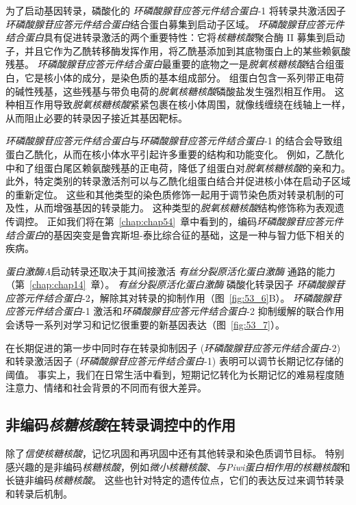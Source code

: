为了启动基因转录，磷酸化的 \textit{环磷酸腺苷应答元件结合蛋白}-1 将转录共激活因子\textit{环磷酸腺苷应答元件结合蛋白}结合蛋白募集到启动子区域。
\textit{环磷酸腺苷应答元件结合蛋白}具有促进转录激活的两个重要特性：它将\textit{核糖核酸}聚合酶 II 募集到启动子，并且它作为乙酰转移酶发挥作用，将乙酰基添加到其底物蛋白上的某些赖氨酸残基。
\textit{环磷酸腺苷应答元件结合蛋白}最重要的底物之一是\textit{脱氧核糖核酸}结合组蛋白，它是核小体的成分，是染色质的基本组成部分。
组蛋白包含一系列带正电荷的碱性残基，这些残基与带负电荷的\textit{脱氧核糖核酸}磷酸盐发生强烈相互作用。
这种相互作用导致\textit{脱氧核糖核酸}紧紧包裹在核小体周围，就像线缠绕在线轴上一样，从而阻止必要的转录因子接近其基因靶标。


\textit{环磷酸腺苷应答元件结合蛋白}与\textit{环磷酸腺苷应答元件结合蛋白}-1 的结合会导致组蛋白乙酰化，从而在核小体水平引起许多重要的结构和功能变化。
例如，乙酰化中和了组蛋白尾区赖氨酸残基的正电荷，降低了组蛋白对\textit{脱氧核糖核酸}的亲和力。
此外，特定类别的转录激活剂可以与乙酰化组蛋白结合并促进核小体在启动子区域的重新定位。 这些和其他类型的染色质修饰一起用于调节染色质对转录机制的可及性，从而增强基因的转录能力。
这种类型的\textit{脱氧核糖核酸}结构修饰称为表观遗传调控。
正如我们将在第~\ref{chap:chap54}~章中看到的，编码\textit{环磷酸腺苷应答元件结合蛋白}的基因突变是鲁宾斯坦-泰比综合征的基础，这是一种与智力低下相关的疾病。


\textit{蛋白激酶A}启动转录还取决于其间接激活 \textit{有丝分裂原活化蛋白激酶} 通路的能力（第~\ref{chap:chap14}~章）。
\textit{有丝分裂原活化蛋白激酶} 磷酸化转录因子 \textit{环磷酸腺苷应答元件结合蛋白}-2，解除其对转录的抑制作用（图~\ref{fig:53_6}B）。
\textit{环磷酸腺苷应答元件结合蛋白}-1 激活和\textit{环磷酸腺苷应答元件结合蛋白}-2 抑制缓解的联合作用会诱导一系列对学习和记忆很重要的新基因表达（图~\ref{fig:53_7}）。


在长期促进的第一步中同时存在转录抑制因子 (\textit{环磷酸腺苷应答元件结合蛋白}-2) 和转录激活因子 (\textit{环磷酸腺苷应答元件结合蛋白}-1) 表明可以调节长期记忆存储的阈值。
事实上，我们在日常生活中看到，短期记忆转化为长期记忆的难易程度随注意力、情绪和社会背景的不同而有很大差异。



\subsection{非编码\textit{核糖核酸}在转录调控中的作用}

除了\textit{信使核糖核酸}，记忆巩固和再巩固中还有其他转录和染色质调节目标。
特别感兴趣的是非编码\textit{核糖核酸}，例如\textit{微小核糖核酸}、\textit{与Piwi蛋白相作用的核糖核酸}和长链非编码\textit{核糖核酸}。
这些也针对特定的遗传位点，它们的表达反过来调节转录和转录后机制。


